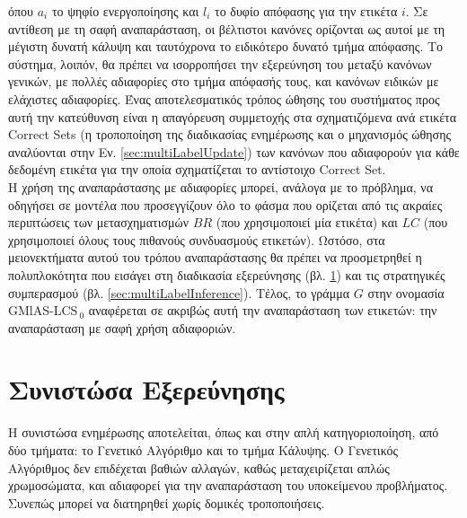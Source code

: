 \begin{center}
\end{center}



όπου $a_{i}$ το ψηφίο ενεργοποίησης και $l_{i}$ το δυφίο απόφασης για την ετικέτα $i$.
Σε αντίθεση με τη σαφή αναπαράσταση, οι βέλτιστοι κανόνες ορίζονται ως αυτοί με τη μέγιστη δυνατή κάλυψη και ταυτόχρονα το ειδικότερο δυνατό τμήμα απόφασης. Το σύστημα, λοιπόν, θα πρέπει να ισορροπήσει την εξερεύνηση του μεταξύ κανόνων γενικών, με πολλές αδιαφορίες στο τμήμα απόφασής τους, και κανόνων ειδικών με ελάχιστες αδιαφορίες. Ένας αποτελεσματικός τρόπος ώθησης του συστήματος προς αυτή την κατεύθυνση είναι η απαγόρευση συμμετοχής στα σχηματιζόμενα ανά ετικέτα Correct Sets (η τροποποίηση της διαδικασίας ενημέρωσης και ο μηχανισμός ώθησης αναλύονται στην Εν. \ref{sec:multiLabelUpdate}) των κανόνων που αδιαφορούν για κάθε δεδομένη ετικέτα για την οποία σχηματίζεται το αντίστοιχο Correct Set. 
\\
Η χρήση της αναπαράστασης με αδιαφορίες μπορεί, ανάλογα με το πρόβλημα, να οδηγήσει σε μοντέλα που προσεγγίζουν όλο το φάσμα που ορίζεται από τις ακραίες περιπτώσεις των μετασχηματισμών $BR$ (που χρησιμοποιεί μία ετικέτα) και $LC$ (που χρησιμοποιεί όλους τους πιθανούς συνδυασμούς ετικετών). Ωστόσο, στα μειονεκτήματα αυτού του τρόπου αναπαράστασης θα πρέπει να προσμετρηθεί η πολυπλοκότητα που εισάγει στη διαδικασία εξερεύνησης (βλ. \ref{sec:multiLabelExploration}) και τις στρατηγικές συμπερασμού (βλ. \ref{sec:multiLabelInference}). Τέλος, το γράμμα $G$ στην ονομασία GMlAS-LCS$_{\:0}$ αναφέρεται σε ακριβώς αυτή την αναπαράσταση των ετικετών: την αναπαράσταση με σαφή χρήση αδιαφοριών.


\section{Συνιστώσα Εξερεύνησης}
\label{sec:multiLabelExploration}
Η συνιστώσα ενημέρωσης αποτελείται, όπως και στην απλή κατηγοριοποίηση, από δύο τμήματα: το Γενετικό Αλγόριθμο και το τμήμα Κάλυψης. Ο Γενετικός Αλγόριθμος δεν επιδέχεται βαθιών αλλαγών, καθώς μεταχειρίζεται απλώς χρωμοσώματα, και αδιαφορεί για την αναπαράσταση του υποκείμενου προβλήματος. Συνεπώς μπορεί να διατηρηθεί χωρίς δομικές τροποποιήσεις. 


